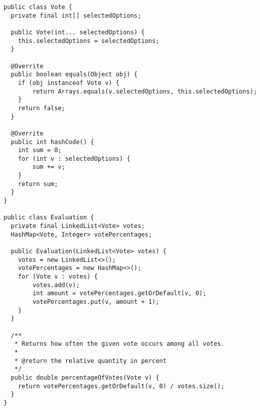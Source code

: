 \begin{lstlisting}
public class Vote {
  private final int[] selectedOptions;

  public Vote(int... selectedOptions) {
    this.selectedOptions = selectedOptions;
  }

  @Overrite
  public boolean equals(Object obj) {
    if (obj instanceof Vote v) {
        return Arrays.equals(v.selectedOptions, this.selectedOptions);
    }
    return false;
  }

  @Overrite
  public int hashCode() {
    int sum = 0;
    for (int v : selectedOptions) {
        sum += v;
    }
    return sum;
  }
}

public class Evaluation {
  private final LinkedList<Vote> votes;
  HashMap<Vote, Integer> votePercentages;

  public Evaluation(LinkedList<Vote> votes) {
    votes = new LinkedList<>();
    votePercentages = new HashMap<>();
    for (Vote v : votes) {
        votes.add(v);
        int amount = votePercentages.getOrDefault(v, 0);
        votePercentages.put(v, amount + 1);
    }
  }

  /**
   * Returns how often the given vote occurs among all votes.
   *
   * @return the relative quantity in percent
   */
  public double percentageOfVotes(Vote v) {
    return votePercentages.getOrDefault(v, 0) / votes.size();
  }
}
\end{lstlisting}